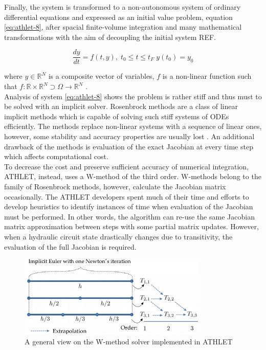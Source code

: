 Finally, the system is transformed to a non-autonomous system of ordinary differential equations and expressed as an initial value problem, equation \ref{eq:athlet-8}, after spacial finite-volume integration and many mathematical transformations with the aim of decoupling the initial system REF. 


\begin{equation} \label{eq:athlet-8}
	\frac{dy}{dt} = f(t,y), \;  t_{0} \leq t \leq t_{F} \; y(t_{0}) = y_{0}
\end{equation}

where $y \in \mathbb{R}^{N}$ is a composite vector of variables, $f$ is a non-linear function such that $f : \mathbb{R} \times \mathbb{R}^{N} \supset \Omega  \rightarrow \mathbb{R}^{N}$  .\\


Analysis of system \ref{eq:athlet-8} shows the problem is rather stiff and thus must to be solved with an implicit solver. Rosenbrock methods are a class of linear implicit methods which is capable of solving such stiff systems of ODEs efficiently. The methods replace non-linear systems with a sequence of linear ones, however, some stability and accuracy properties are usually lost \cite{blom2013rosenbrock}. An additional drawback of the methods is evaluation of the exact Jacobian at every time step which affects computational cost.\\


To decrease the cost and preserve sufficient accuracy of numerical integration, ATHLET, instead, uses a W-method of the third order. W-methods belong to the family of Rosenbrock methods, however, calculate the Jacobian matrix occasionally. The ATHLET developers spent much of their time and efforts to develop heuristics to identify instances of time when evaluation of the Jacobian must be performed. In other words, the algorithm can re-use the same Jacobian matrix approximation between steps with some partial matrix updates. However, when a hydraulic circuit state drastically changes due to transitivity, the evaluation of the full Jacobian is required.\\


\figpointer{\ref{fig:introduction-w-method-scheme}}
\begin{figure}[htpb]
  \centering
  \includegraphics[width=0.8\textwidth]{figures/introduction-rosenbrock-scheme.png}
\caption{A general view on the W-method solver implemented in ATHLET}
\label{fig:introduction-w-method-scheme}
\end{figure}


